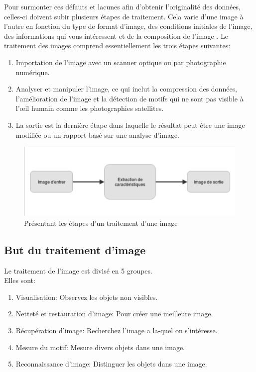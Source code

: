 \documentclass[12pt]{article}
\begin{document}
Pour surmonter ces défauts et lacunes afin d'obtenir l'originalité des données, celles-ci doivent subir plusieurs étapes de traitement. Cela varie d'une image à l'autre en fonction du type de format d'image, des conditions initiales de l'image, des informations qui vous intéressent et de la composition de l'image \cite{14}.
Le traitement des images comprend essentiellement les trois étapes suivantes:
\begin{enumerate}
	\item Importation de l'image avec un scanner optique ou par photographie numérique.
	\item Analyser et manipuler l'image, ce qui inclut la compression des données, l'amélioration de l'image et la détection de motifs qui ne sont pas visible à l’œil humain comme les photographies satellites.
	\item La sortie est la dernière étape dans laquelle le résultat peut être une image modifiée ou un rapport basé sur une analyse d'image.
\end{enumerate}
\begin{figure}[h]
\centering
\includegraphics[scale=1, width=13cm]{img-Chapiter-1/1.png}
\caption{Présentant les étapes d’un traitement d’une image}
\end{figure}

\subsection{But du traitement d'image}
Le traitement de l'image est divisé en 5 groupes.\\
Elles sont:
\begin{enumerate}
	\item Visualisation: Observez les objets non visibles.
	\item Netteté et restauration d'image: Pour créer une meilleure image.
	\item Récupération d'image: Recherchez l'image a la-quel on s’intéresse.
	\item Mesure du motif: Mesure divers objets dans une image.
	\item Reconnaissance d'image: Distinguer les objets dans une image.
\end{enumerate}
\end{document}
